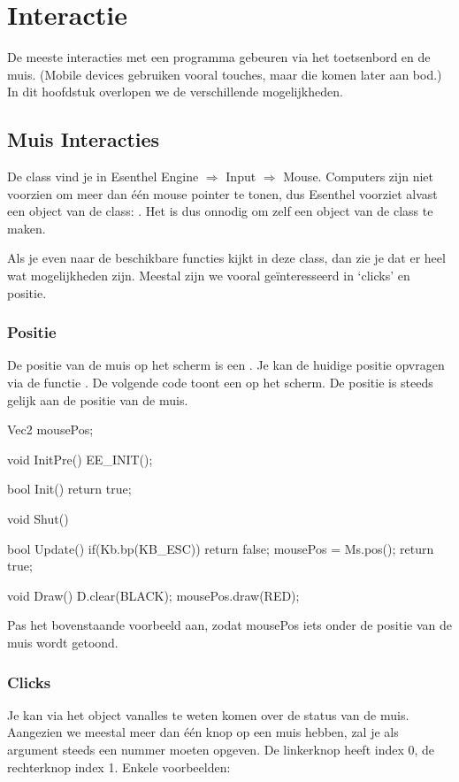\chapter{Interactie}
De meeste interacties met een programma gebeuren via het toetsenbord en de muis. (Mobile devices gebruiken vooral touches, maar die komen later aan bod.) In dit hoofdstuk overlopen we de verschillende mogelijkheden.

\section{Muis Interacties}
De class  vind je in Esenthel Engine $\Rightarrow$ Input $\Rightarrow$ Mouse. Computers zijn niet voorzien om meer dan \'e\'en mouse pointer te tonen, dus Esenthel voorziet alvast een object van de class: . Het is dus onnodig om zelf een object van de class  te maken.

Als je even naar de beschikbare functies kijkt in deze class, dan zie je dat er heel wat mogelijkheden zijn. Meestal zijn we vooral ge\"interesseerd in `clicks' en positie.

\subsection{Positie}
De positie van de muis op het scherm is een . Je kan de huidige positie opvragen via de functie . De volgende code toont een  op het scherm. De positie is steeds gelijk aan de positie van de muis. 



\begin{code}
Vec2 mousePos;

void InitPre()
{
   EE_INIT();
}

bool Init()
{   
   return true;
}

void Shut() {}

bool Update()
{
   if(Kb.bp(KB_ESC)) return false;  
   mousePos = Ms.pos();  
   return true;
}

void Draw()
{
   D.clear(BLACK);
   mousePos.draw(RED);
}
\end{code}

\begin{exercise}
Pas het bovenstaande voorbeeld aan, zodat mousePos iets onder de positie van de muis wordt getoond.
\end{exercise} 

\subsection{Clicks}
Je kan via het  object vanalles te weten komen over de status van de muis. Aangezien we meestal meer dan \'e\'en knop op een muis hebben, zal je als argument steeds een nummer moeten opgeven. De linkerknop heeft index 0, de rechterknop index 1. Enkele voorbeelden: 

